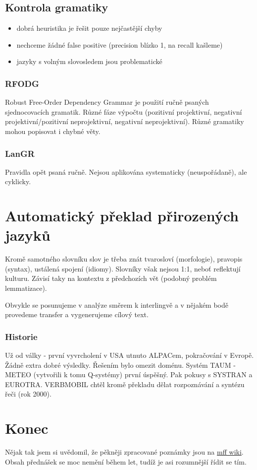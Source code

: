 \documentclass[a4paper]{article}
\begin{document}
\subsection*{Kontrola gramatiky}
\begin{itemize}
	\item dobrá heuristika je řešit pouze nejčastější chyby
	\item nechceme žádné false positive (precision blízko 1, na recall kašleme)
	\item jazyky s volným slovosledem jsou problematické
\end{itemize}

\subsubsection*{RFODG}
Robust Free-Order Dependency Grammar je použití ručně psaných sjednocovacích gramatik. Různé fáze výpočtu (pozitivní projektivní, negativní projektivní/pozitivní neprojektivní, negativní neprojektivní). Různé gramatiky mohou popisovat i chybné věty.

\subsubsection*{LanGR}
Pravidla opět psaná ručně. Nejsou aplikována systematicky (neuspořádaně), ale cyklicky. 

\section*{Automatický překlad přirozených jazyků}
Kromě samotného slovníku slov je třeba znát tvarosloví (morfologie), pravopis (syntax), ustálená spojení (idiomy). Slovníky však nejsou 1:1, neboť reflektují kulturu. Závisí taky na kontextu z předchozích vět (podobný problém lemmatizace).

Obvykle se posunujeme v analýze směrem k interlingvě a v nějakém bodě provedeme transfer a vygenerujeme cílový text.

\subsubsection*{Historie}
Už od války - první vyvrcholení v USA utnuto ALPACem, pokračování v Evropě. Žádně extra dobré výsledky. Řešením bylo omezit doménu. Systém TAUM - METEO (vytvořili k tomu Q-systémy) první úspěšný. Pak pokusy s SYSTRAN a EUROTRA. VERBMOBIL chtěl kromě překladu dělat rozpoznávání a syntézu řeči (rok 2000). 




\section*{Konec}
Nějak tak jsem si uvědomil, že pěkněji zpracované poznámky jsou na \href{http://wiki.matfyz.cz/wiki/PFL012-pozn\%C3\%A1mky}{mff wiki}. Obsah přednášek se moc nemění během let, tudíž je asi rozumnější řídit se tím.
\end{document}
